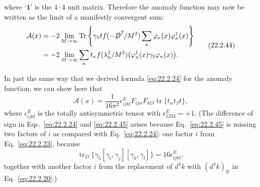 where `$\mathbf{1}$' is the $4\cdot4$ unit matrix. Therefore the anomaly
function may now be written as the limit of a manifestly convergent sum:
\begin{equation}
 \begin{aligned}
 \mathcal A(x)
 &=-2\lim_{M\to\infty}\operatorname{Tr}
 \left\{\gamma_5t f(-\sl{D}^2/M^2)
 \sum_\kappa\varphi_\kappa(x)\varphi_\kappa^\dagger(x)\right\}\\
 &=-2\lim_{M\to\infty}\sum_\kappa
 t_\kappa f(\lambda_\kappa^2/M^2)
 \bigl(\varphi_\kappa^\dagger(x)\gamma_5\varphi_\kappa(x)\bigr).
 \end{aligned}
 \tag{22.2.44}\label{eq:22.2.44}
\end{equation}

In just the same way that we derived formula \eqref{eq:22.2.24} for the
anomaly function, we can show here that
\begin{equation}
 \mathcal A(x)=\frac{1}{16\pi^2}\epsilon^E_{ijkl}
 F_{ij\alpha}F_{kl\beta}\operatorname{tr}\{t_\alpha t_\beta t\},
 \tag{22.2.45}\label{eq:22.2.45}
\end{equation}
where $\epsilon^E_{ijkl}$ is the totally antisymmetric tensor with
$\epsilon^E_{1234}=+1$. (The difference of sign in
Eqs.~\eqref{eq:22.2.24} and \eqref{eq:22.2.45} arises because
Eq.~\eqref{eq:22.2.45} is missing two factors of $i$ as compared with
Eq.~\eqref{eq:22.2.24}: one factor $i$ from Eq.~\eqref{eq:22.2.23},
because
\[
 \operatorname{tr}_{D}\{\gamma_5
 [\gamma_i,\gamma_j][\gamma_k,\gamma_l]\}
 =16\epsilon^E_{ijkl},
\]
together with another factor $i$ from the replacement of $d^4k$ with
$(d^4k)_E$ in Eq.~\eqref{eq:22.2.20}.)

